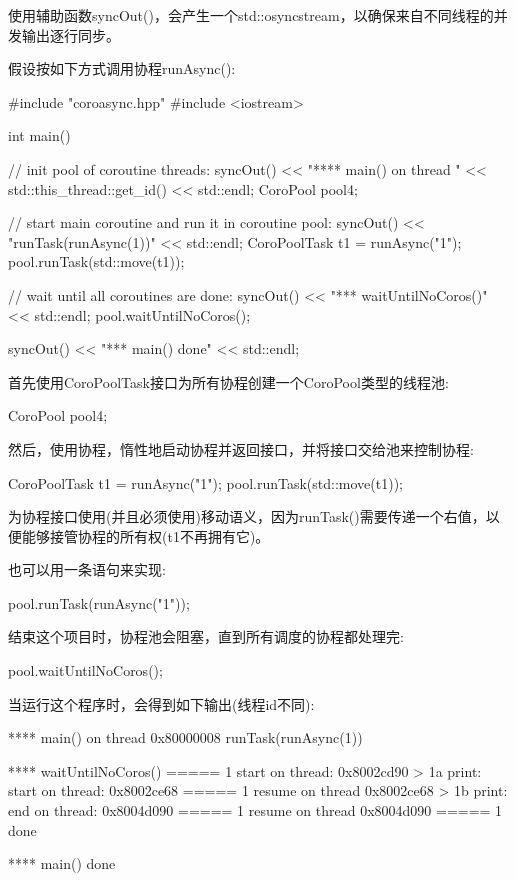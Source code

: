 使用辅助函数syncOut()，会产生一个std::osyncstream，以确保来自不同线程的并发输出逐行同步。

假设按如下方式调用协程runAsync():


\begin{cpp}
#include "coroasync.hpp"
#include <iostream>

int main()
{
	// init pool of coroutine threads:
	syncOut() << "**** main() on thread " << std::this_thread::get_id()
			  << std::endl;
	CoroPool pool{4};

	// start main coroutine and run it in coroutine pool:
	syncOut() << "runTask(runAsync(1))" << std::endl;
	CoroPoolTask t1 = runAsync("1");
	pool.runTask(std::move(t1));

	// wait until all coroutines are done:
	syncOut() << "\n**** waitUntilNoCoros()" << std::endl;
	pool.waitUntilNoCoros();

	syncOut() << "\n**** main() done" << std::endl;
}
\end{cpp}

首先使用CoroPoolTask接口为所有协程创建一个CoroPool类型的线程池:

\begin{cpp}
CoroPool pool{4};
\end{cpp}

然后，使用协程，惰性地启动协程并返回接口，并将接口交给池来控制协程:

\begin{cpp}
CoroPoolTask t1 = runAsync("1");
pool.runTask(std::move(t1));
\end{cpp}

为协程接口使用(并且必须使用)移动语义，因为runTask()需要传递一个右值，以便能够接管协程的所有权(t1不再拥有它)。

也可以用一条语句来实现:

\begin{cpp}
pool.runTask(runAsync("1"));
\end{cpp}

结束这个项目时，协程池会阻塞，直到所有调度的协程都处理完:

\begin{cpp}
pool.waitUntilNoCoros();
\end{cpp}

当运行这个程序时，会得到如下输出(线程id不同):

\begin{shell}
**** main() on thread 0x80000008
runTask(runAsync(1))

**** waitUntilNoCoros()
===== 1 start on thread: 0x8002cd90
    > 1a print: start on thread: 0x8002ce68
===== 1 resume on thread 0x8002ce68
    > 1b print: end on thread: 0x8004d090
===== 1 resume on thread 0x8004d090
===== 1 done

**** main() done
\end{shell}

